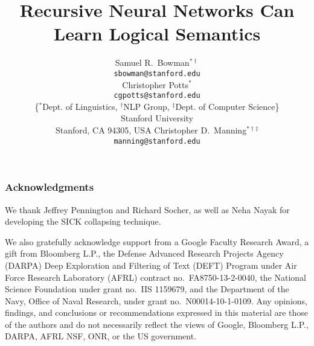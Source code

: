 \documentclass[11pt]{article}
\title{Recursive Neural Networks Can Learn Logical Semantics}
\author{
Samuel R.\ Bowman$^{\ast\dag}$ \\
\texttt{sbowman@stanford.edu} \\[2ex]
\And
Christopher Potts$^{\ast}$\\
\texttt{cgpotts@stanford.edu} \\[2ex]
\{$^{\ast}$Dept. of Linguistics, $^{\dag}$NLP Group, $^{\ddag}$Dept. of Computer Science\}\\
Stanford University \\
Stanford, CA 94305, USA
\And
Christopher D.\ Manning$^{\ast\dag\ddag}$\\
\texttt{manning@stanford.edu}\\[2ex]
}
\date{}
\begin{document}
\maketitle










\subsubsection*{Acknowledgments}

We thank Jeffrey Pennington and Richard Socher, as well as Neha Nayak for developing the SICK collapsing technique.

We also gratefully acknowledge support from %
a Google Faculty Research Award, %
a gift from Bloomberg L.P., 
the Defense Advanced Research Projects Agency (DARPA) Deep Exploration and Filtering of Text (DEFT) Program under Air Force Research Laboratory (AFRL) contract no.~FA8750-13-2-0040,
the National Science Foundation under grant no.~IIS 1159679, and %
the Department of the Navy, Office of Naval Research, under grant no.~N00014-10-1-0109.
%
Any opinions, findings, and conclusions or recommendations expressed in this material are those of the authors and do not necessarily reflect the views of 
Google, 
Bloomberg L.P.,
DARPA,
AFRL
NSF, 
ONR, or 
the US government.
\end{document}
